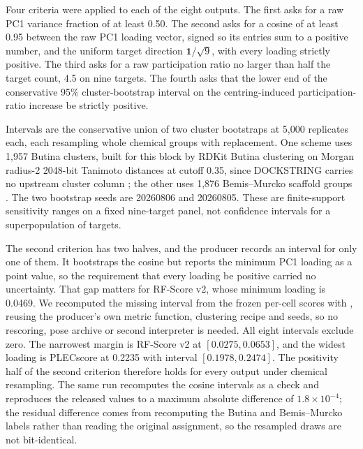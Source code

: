 
Four criteria were applied to each of the eight outputs. The first asks for a raw PC1 variance
fraction of at least 0.50. The second asks for a cosine of at least 0.95 between the raw PC1
loading vector, signed so its entries sum to a positive number, and the uniform target
direction $\mathbf{1}/\sqrt{9}$, with every loading strictly positive. The third asks for a raw
participation ratio no larger than half the target count, 4.5 on nine targets. The fourth asks
that the lower end of the conservative 95\% cluster-bootstrap interval on the
centring-induced participation-ratio increase be strictly positive.

Intervals are the conservative union of two cluster bootstraps at 5{,}000 replicates each,
each resampling whole chemical groups with replacement. One scheme uses 1{,}957 Butina
clusters, built for this block by RDKit Butina clustering on Morgan radius-2 2048-bit
Tanimoto distances at cutoff 0.35, since DOCKSTRING carries no upstream cluster column
\cite{butina1999,morgan1965,rogers2010}; the other uses 1{,}876 Bemis--Murcko scaffold groups
\cite{murcko1996}. The two bootstrap seeds are 20260806 and 20260805. These are
finite-support sensitivity ranges on a fixed nine-target panel, not confidence intervals for a
superpopulation of targets.


The second criterion has two halves, and the producer records an interval for only one of
them. It bootstraps the cosine but reports the minimum PC1 loading as a point value, so the
requirement that every loading be positive carried no uncertainty. That gap matters for
RF-Score v2, whose minimum loading is 0.0469. We recomputed the missing interval from the
frozen per-cell scores with
, reusing the producer's own metric
function, clustering recipe and seeds, so no rescoring, pose archive or second interpreter is
needed. All eight intervals exclude zero. The narrowest margin is RF-Score v2 at
$[0.0275, 0.0653]$, and the widest loading is PLECscore at 0.2235 with interval
$[0.1978, 0.2474]$. The positivity half of the second criterion therefore holds for every
output under chemical resampling. The same run recomputes the cosine intervals as a check and
reproduces the released values to a maximum absolute difference of $1.8\times10^{-4}$; the
residual difference comes from recomputing the Butina and Bemis--Murcko labels rather than
reading the original assignment, so the resampled draws are not bit-identical.

